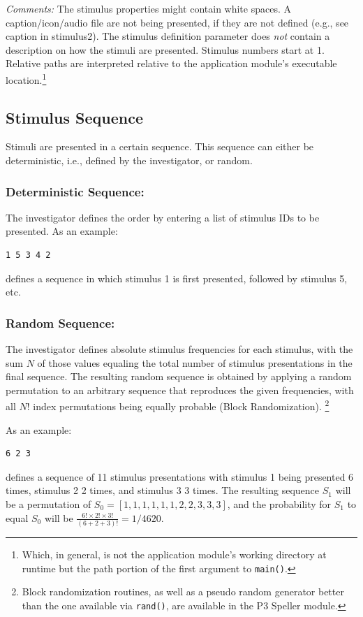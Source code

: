 \documentclass[letterpaper,oneside,12pt]{article}
\begin{document}
\emph{Comments:} The stimulus properties might contain white spaces. A 
caption/icon/audio file are not being presented, if they are not defined (e.g., 
see caption in stimulus2). The stimulus definition parameter does \emph{not} contain 
a description on how the stimuli are presented. Stimulus numbers start at 1.
Relative paths are interpreted relative to the application module's executable
location.\footnote{Which, in general, is not the application module's
working directory at runtime but the path portion of the first argument to \texttt{main()}.}

\subsection{Stimulus Sequence}

Stimuli are presented in a certain sequence. This sequence can either be 
deterministic, i.e., defined by the investigator, or random. 

\subsubsection{Deterministic Sequence:}The investigator defines the order by 
entering a list of stimulus IDs to be presented. As an example: 
\begin{verbatim} 
1 5 3 4 2 
\end{verbatim} 
defines a sequence in which stimulus 1 is first presented, followed by 
stimulus 5, etc.

\subsubsection{Random Sequence:}The investigator defines absolute stimulus 
frequencies for each stimulus, with the sum $N$ of those values equaling the total
number of stimulus presentations in the final sequence. The resulting random
sequence is obtained by applying a random permutation to an arbitrary sequence
that reproduces the given frequencies, with all $N!$ index permutations being
equally probable (Block Randomization).
\footnote{Block randomization routines, as well as a pseudo random generator better
than the one available via \texttt{rand()}, are available in the P3 Speller module.}

As an example: 
\begin{verbatim} 
6 2 3
\end{verbatim} 
defines a sequence of 11 stimulus presentations with stimulus 1 being presented 6
times, stimulus 2 2 times, and stimulus 3 3 times. The resulting sequence $S_1$ will
be a permutation of $S_0 = [1, 1, 1, 1, 1, 1, 2, 2, 3, 3, 3]$, and the probability
for $S_1$ to equal $S_0$ will be
$\frac{6!\times2!\times3!}{(6+2+3)!}=1/4620$.
\end{document}
